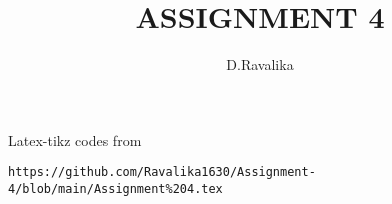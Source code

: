\documentclass[journal,12pt,twocolumn]{IEEEtran}
\DeclareMathOperator*{\Res}{Res}
\begin{document}
\newtheorem{theorem}{Theorem}[section]
\newtheorem{problem}{Problem}
\newtheorem{proposition}{Proposition}[section]
\newtheorem{lemma}{Lemma}[section]
\newtheorem{corollary}[theorem]{Corollary}
\newtheorem{example}{Example}[section]
\newtheorem{definition}[problem]{Definition}

\newcommand{\BEQA}{\begin{eqnarray}}
\newcommand{\EEQA}{\end{eqnarray}}
\newcommand{\define}{\stackrel{\triangle}{=}}

\providecommand{\mbf}{\mathbf}
\providecommand{\pr}[1]{\ensuremath{\Pr\left(#1\right)}}
\providecommand{\qfunc}[1]{\ensuremath{Q\left(#1\right)}}
\providecommand{\sbrak}[1]{\ensuremath{{}\left[#1\right]}}
\providecommand{\lsbrak}[1]{\ensuremath{{}\left[#1\right.}}
\providecommand{\rsbrak}[1]{\ensuremath{{}\left.#1\right]}}
\providecommand{\brak}[1]{\ensuremath{\left(#1\right)}}
\providecommand{\lbrak}[1]{\ensuremath{\left(#1\right.}}
\providecommand{\rbrak}[1]{\ensuremath{\left.#1\right)}}
\providecommand{\cbrak}[1]{\ensuremath{\left\{#1\right\}}}
\providecommand{\lcbrak}[1]{\ensuremath{\left\{#1\right.}}
\providecommand{\rcbrak}[1]{\ensuremath{\left.#1\right\}}}
\theoremstyle{remark}
\newtheorem{rem}{Remark}
\newcommand{\sgn}{\mathop{\mathrm{sgn}}}
\providecommand{\abs}[1]{\left\vert#1\right\vert}
\providecommand{\res}[1]{\Res\displaylimits_{#1}} 
\providecommand{\norm}[1]{\left\lVert#1\right\rVert}
\providecommand{\mtx}[1]{\mathbf{#1}}
\providecommand{\mean}[1]{E\left[ #1 \right]}
\providecommand{\fourier}{\overset{\mathcal{F}}{ \rightleftharpoons}}
\providecommand{\system}{\overset{\mathcal{H}}{ \longleftrightarrow}}
\newcommand{\solution}{\noindent \textbf{Solution: }}
\newcommand{\cosec}{\,\text{cosec}\,}
\providecommand{\dec}[2]{\ensuremath{\overset{#1}{\underset{#2}{\gtrless}}}}
\newcommand{\myvec}[1]{\ensuremath{\begin{pmatrix}#1\end{pmatrix}}}
\newcommand{\mydet}[1]{\ensuremath{\begin{vmatrix}#1\end{vmatrix}}}
\makeatletter
{}
\makeatother
\let\StandardTheFigure\thefigure
\let\vec\mathbf
\renewcommand{\thefigure}{\theproblem}
\def\putbox#1#2#3{\makebox[0in][l]{\makebox[#1][l]{}\raisebox{\baselineskip}[0in][0in]{\raisebox{#2}[0in][0in]{#3}}}}
     \def\rightbox#1{\makebox[0in][r]{#1}}
     \def\centbox#1{\makebox[0in]{#1}}
     \def\topbox#1{\raisebox{-\baselineskip}[0in][0in]{#1}}
     \def\midbox#1{\raisebox{-0.5\baselineskip}[0in][0in]{#1}}
\vspace{3cm}
\title{ASSIGNMENT 4}
\author{D.Ravalika}
\maketitle
\newpage
\bigskip
\renewcommand{\thefigure}{\theenumi}
\renewcommand{\thetable}{\theenumi}
%
Latex-tikz codes from 
%
\begin{lstlisting}
https://github.com/Ravalika1630/Assignment-4/blob/main/Assignment%204.tex
\end{lstlisting}
%
\end{document}
